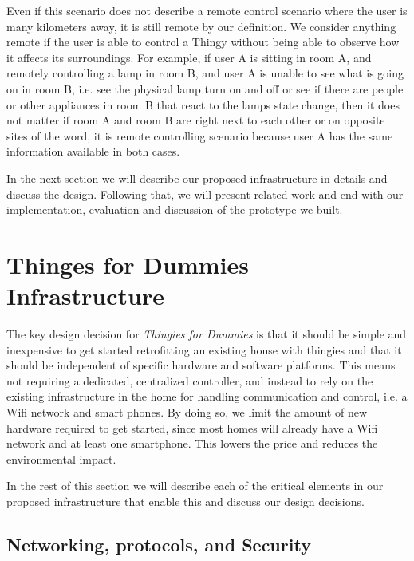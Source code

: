 \documentclass{ubicomp2012}
\begin{document}
Even if this scenario does not describe a remote control scenario where the user is many kilometers away, it is still remote by our definition. We consider anything remote if the user is able to control a Thingy without being able to observe how it affects its surroundings. For example,  if user A is sitting in room A, and remotely controlling a lamp in room B, and user A is unable to see what is going on in room B, i.e. see the physical lamp turn on and off or see if there are people or other appliances in room B that react to the lamps state change, then it does not matter if room A and room B are right next to each other or on opposite sites of the word, it is remote controlling scenario because user A has the same information available in both cases.

In the next section we will describe our proposed infrastructure in details and discuss the design. Following that, we will present related work and end with our implementation, evaluation and discussion of the prototype we built.

\section{Thinges for Dummies Infrastructure}

The key design decision for \textit{Thingies for Dummies} is that it should be simple and  inexpensive to get started retrofitting an existing house with thingies and that it should be independent of specific hardware and software platforms. This means not requiring a dedicated, centralized controller, and instead to rely on the existing infrastructure in the home for handling communication and control, i.e. a Wifi network and smart phones. By doing so, we limit the amount of new hardware required to get started, since most homes will already have a Wifi network and at least one smartphone. This lowers the price and reduces the environmental impact.

In the rest of this section we will describe each of the critical elements in our proposed infrastructure that enable this and discuss our design decisions.

\subsection{Networking, protocols, and Security}
\end{document}
